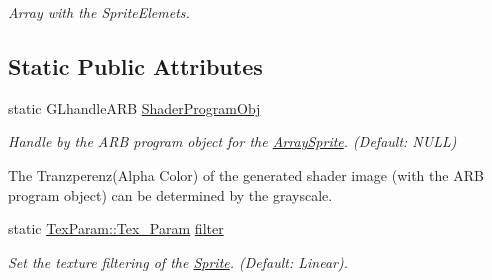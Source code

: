 \begin{DoxyCompactItemize}
\begin{DoxyCompactList}\small\item\em Array with the SpriteElemets. \item\end{DoxyCompactList}\end{DoxyCompactItemize}
\subsection*{Static Public Attributes}
\begin{DoxyCompactItemize}
\item 
\hypertarget{class_f2_c_1_1_array_sprite_ab8832ebf9d9d32ddb93801322b4d70b5}{
static GLhandleARB \hyperlink{class_f2_c_1_1_array_sprite_ab8832ebf9d9d32ddb93801322b4d70b5}{ShaderProgramObj}}
\label{class_f2_c_1_1_array_sprite_ab8832ebf9d9d32ddb93801322b4d70b5}

\begin{DoxyCompactList}\small\item\em Handle by the ARB program object for the \hyperlink{class_f2_c_1_1_array_sprite}{ArraySprite}. (Default: NULL) \par
 The Tranzperenz(Alpha Color) of the generated shader image (with the ARB program object) can be determined by the grayscale. \item\end{DoxyCompactList}\item 
\hypertarget{class_f2_c_1_1_array_sprite_a75dbddbac91e1fc643007d165a302ef5}{
static \hyperlink{namespace_f2_c_1_1_tex_param_a64299c3972944468af4e8b0394c936c6}{TexParam::Tex\_\-Param} \hyperlink{class_f2_c_1_1_array_sprite_a75dbddbac91e1fc643007d165a302ef5}{filter}}
\label{class_f2_c_1_1_array_sprite_a75dbddbac91e1fc643007d165a302ef5}

\begin{DoxyCompactList}\small\item\em Set the texture filtering of the \hyperlink{class_f2_c_1_1_sprite}{Sprite}. (Default: Linear). \item\end{DoxyCompactList}\end{DoxyCompactItemize}


